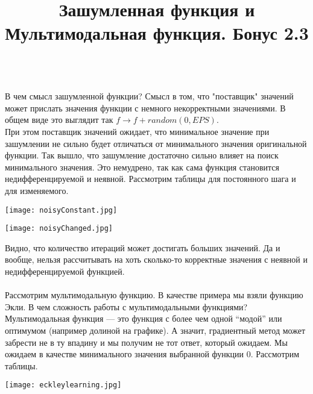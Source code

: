 \documentclass[12pt]{article}
\begin{document}
\title{\textbf{Зашумленная функция и Мультимодальная функция. Бонус 2.3}}\\
В чем смысл зашумленной функции? Смысл в том, что "поставщик" значений может прислать значения функции с немного некорректными значениями. В общем виде это выглядит так $f \rightarrow f + random(0, EPS)$.\\ При этом поставщик значений ожидает, что минимальное значение при зашумлении не сильно будет отличаться от минимального значения оригинальной функции. Так вышло, что зашумление достаточно сильно влияет на поиск минимального значения. Это немудрено, так как сама функция становится недифференцируемой и неявной. Рассмотрим таблицы для постоянного шага и для изменяемого.

\begin{center}

\centering

\texttt{[image: noisyConstant.jpg]}


\label{fig:mpr}

\end{center}


\begin{center}

\centering

\texttt{[image: noisyChanged.jpg]}



\label{fig:mpr}

\end{center}

Видно, что количество итераций может достигать больших значений. Да и вообще, нельзя рассчитывать на хоть сколько-то корректные значения с неявной и недифференцируемой функцией. \\\\

Рассмотрим мультимодальную функцию. В качестве примера мы взяли функцию Экли. В чем сложность работы с мультимодальными функциями? Мультимодальная функция — это функция с более чем одной “модой” или оптимумом (например долиной на графике). А значит, градиентный метод может забрести не в ту впадину и мы получим не тот ответ, который ожидаем. Мы ожидаем в качестве минимального значения выбранной функции 0. Рассмотрим таблицы.

\begin{center}

\centering

\texttt{[image: eckleylearning.jpg]}



\label{fig:mpr}

\end{center}
\end{document}
